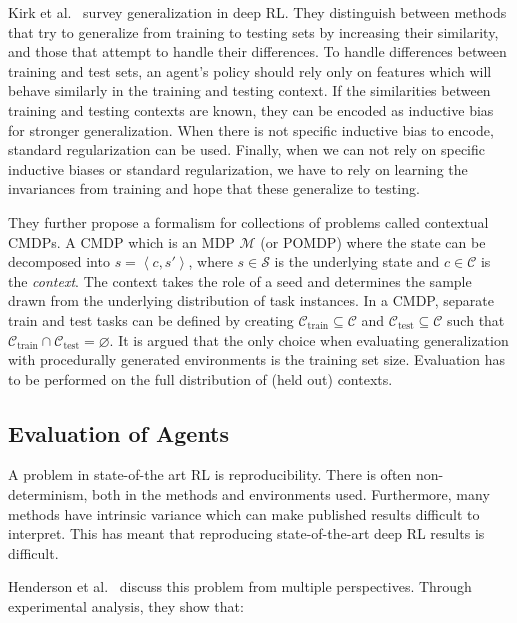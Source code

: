 Kirk et al.~\cite{kirk_survey_2022} survey generalization in deep RL.
They distinguish between methods that try to generalize from training to testing sets by increasing their similarity, and those that attempt to handle their differences.
To handle differences between training and test sets, an agent's policy should rely only on features which will behave similarly in the training and testing context.
If the similarities between training and testing contexts are known, they can be encoded as inductive bias for stronger generalization.
When there is not specific inductive bias to encode, standard regularization can be used.
Finally, when we can not rely on specific inductive biases or standard regularization, we have to rely on learning the invariances from training and hope that these generalize to testing.


They further propose a formalism for collections of problems called contextual CMDPs.
A CMDP which is an MDP \(\mathcal{M}\) (or POMDP) where the state can be decomposed into \(s = \left\langle c, s' \right\rangle\),
where \(s \in \mathcal{S}\) is the underlying state and \(c \in \mathcal{C}\) is the \textit{context}.
The context takes the role of a seed and determines the sample drawn from the underlying distribution of task instances.
In a CMDP, separate train and test tasks can be defined by creating \(\mathcal{C}_\text{train} \subseteq \mathcal{C}\) and \(\mathcal{C}_\text{test} \subseteq \mathcal{C}\) such that \(\mathcal{C}_\text{train} \cap \mathcal{C}_\text{test} = \varnothing\).
It is argued that the only choice when evaluating generalization with procedurally generated environments is the training set size.
Evaluation has to be performed on the full distribution of (held out) contexts.

\subsection{Evaluation of Agents}

A problem in state-of-the art RL is reproducibility.
There is often non-determinism, both in the methods and environments used.
Furthermore, many methods have intrinsic variance which can make published results difficult to interpret.
This has meant that reproducing state-of-the-art deep RL results is difficult.

Henderson et al.~\cite{henderson_matters_2018} discuss this problem from multiple perspectives.
Through experimental analysis, they show that:

